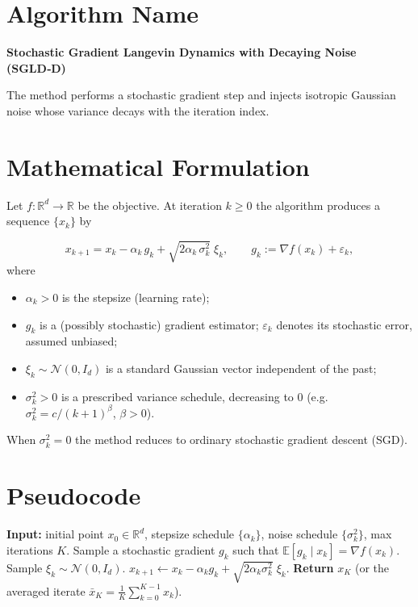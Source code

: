 \documentclass{article}
\newcommand{\E}{\mathbb{E}}
\newcommand{\R}{\mathbb{R}}
\newcommand{\grad}{\nabla}
\begin{document}
\section*{Algorithm Name}
\textbf{Stochastic Gradient Langevin Dynamics with Decaying Noise (SGLD‑D)}  

The method performs a stochastic gradient step and injects isotropic Gaussian noise whose variance decays with the iteration index.

\section*{Mathematical Formulation}
Let $f:\R^{d}\rightarrow\R$ be the objective.  
At iteration $k\ge 0$ the algorithm produces a sequence $\{x_k\}$ by  

\begin{equation}
\boxed{
x_{k+1}=x_{k}-\alpha_k\, g_k+\sqrt{2\alpha_k\,\sigma_k^{2}}\;\xi_k},
\qquad 
g_k:=\grad f(x_k)+\varepsilon_k,
\end{equation}
where  

\begin{itemize}[noitemsep,topsep=0pt]
\item $\alpha_k>0$ is the stepsize (learning rate);
\item $g_k$ is a (possibly stochastic) gradient estimator; $\varepsilon_k$ denotes its stochastic error, assumed unbiased;
\item $\xi_k\sim\mathcal N(0,I_d)$ is a standard Gaussian vector independent of the past;
\item $\sigma_k^{2}>0$ is a prescribed variance schedule, decreasing to $0$ (e.g. $\sigma_k^{2}=c/(k+1)^{\beta}$, $\beta>0$).
\end{itemize}

When $\sigma_k^{2}=0$ the method reduces to ordinary stochastic gradient descent (SGD).  

\section*{Pseudocode}
\begin{algorithm}[H]
\caption{SGLD‑D}
\begin{algorithmic}[1]
\State \textbf{Input:} initial point $x_0\in\R^{d}$, stepsize schedule $\{\alpha_k\}$, noise schedule $\{\sigma_k^{2}\}$, max iterations $K$.
    \State Sample a stochastic gradient $g_k$ such that $\E[g_k\mid x_k]=\grad f(x_k)$.
    \State Sample $\xi_k\sim\mathcal N(0,I_d)$.
    \State $x_{k+1}\gets x_k-\alpha_k g_k+\sqrt{2\alpha_k\sigma_k^{2}}\;\xi_k$.
\EndFor
\State \textbf{Return} $x_K$ (or the averaged iterate $\bar x_K=\frac1K\sum_{k=0}^{K-1}x_k$).
\end{algorithmic}
\end{algorithm}
\end{document}
